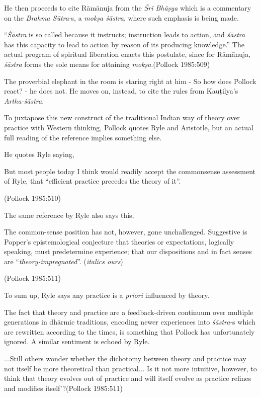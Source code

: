 He then proceeds to cite Rāmānuja from the {\sl Śrī Bhāṣya} which is a commentary on the {\sl Brahma Sūtra}-s, a {\sl mokṣa śāstra}, where such emphasis is being made.
\begin{myquote}
``{{\sl Śāstra}} is so called because it instructs; instruction leads to action, and {\sl śāstra} has this capacity to lead to action by reason of its producing knowledge.'' The actual program of spiritual liberation enacts this postulate, since for Rāmānuja, {\sl śāstra} forms the sole means for attaining {\sl mokṣa}.\hfill (Pollock 1985:509)
\end{myquote}

The proverbial elephant in the room is staring right at him - So how does Pollock react? - he does not. He moves on, instead, to cite the rules from Kauṭilya's {\sl Artha-śāstra}.

To juxtapose this new construct of the traditional Indian way of theory over practice with Western thinking, Pollock quotes Ryle and Aristotle, but an actual full reading of the reference implies something else.

He quotes Ryle saying,
\begin{myquote}
But most people today I think would readily accept the commonsense assessment of Ryle, that ``efficient practice precedes the theory of it''.

\hfill (Pollock 1985:510)
\end{myquote}

The same reference by Ryle also says this,
\begin{myquote}
The common-sense position has not, however, gone unchallenged. Suggestive is Popper's epistemological conjecture that theories or expectations, logically speaking, must predetermine experience; that our dispositions and in fact senses are ``{\sl theory-impregnated}''. ({\sl italics ours})

\hfill (Pollock 1985:511)
\end{myquote}

To sum up, Ryle says any practice is a {\sl priori} influenced by theory.

The fact that theory and practice are a feedback-driven continuum over multiple generations in dhārmic traditions, encoding newer experiences into {\sl śāstra}-s which are rewritten according to the times, is something that Pollock has unfortunately ignored. A similar sentiment is echoed by Ryle.
\begin{myquote}
...Still others wonder whether the dichotomy between theory and practice may not itself be more theoretical than practical... Is it not more intuitive, however, to think that theory evolves out of practice and will itself evolve as practice refines and modifies itself'?\hfill (Pollock 1985:511)
\end{myquote}

